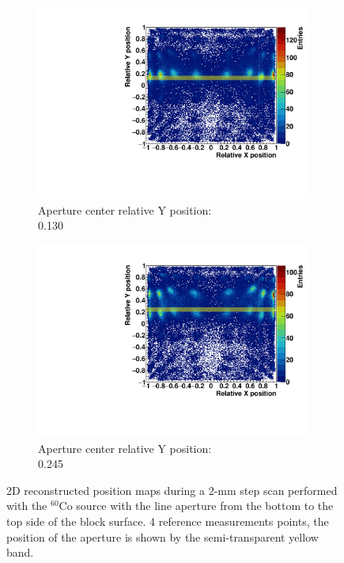 \begin{figure}
\begin{subfigure}[t]{0.5\textwidth}
\centering
\includegraphics[width=\textwidth]{03_GraphicFiles/chapter3_CLaRySproto/Absorber/images_scan/line_2mm_vert/run14_floodMap.pdf}
\caption{Aperture center relative Y position: \\ 0.130}
\label{chap3::fig::scan_map3_vert}
\end{subfigure}
\begin{subfigure}[t]{0.5\textwidth}
\centering
\includegraphics[width=\textwidth]{03_GraphicFiles/chapter3_CLaRySproto/Absorber/images_scan/line_2mm_vert/run15_floodMap.pdf}
\caption{Aperture center relative Y position: \\ 0.245}
\label{chap3::fig::scan_map4_vert}
\end{subfigure}
\caption{2D reconstructed position maps during a 2-mm step scan performed with the $^{60}$Co source with the line aperture from the bottom to the top side of the block surface. 4 reference measurements points, the position of the aperture is shown by the semi-transparent yellow band.}
\label{chap3::fig::ScanFloodMap_Vert}
\end{figure}


